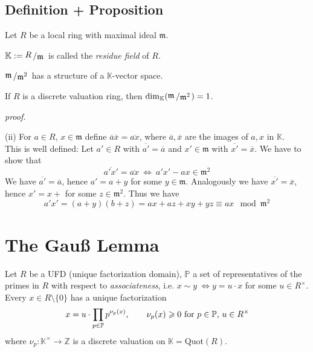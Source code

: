 \documentclass[12pt]{book}
\newcommand{\slant}[2]{{\raisebox{.1em}{$#1$}\left/\raisebox{-.1em}{$#2$}\right.}}
\begin{document}
\begin{spacing}{1.3}
\subsection{Definition + Proposition} %
Let $R$ be a local ring with maximal ideal $\mathfrak{m}$. 
\begin{compactenum}
\item $\mathbb{K}:= \slant{R}{\mathfrak{m}}$ is called the \textit{residue field} of $R$.
\item $\slant{\mathfrak{m}}{\mathfrak{m}^2}$ has a structure of a $\mathbb{K}$-vector space.
\item If $R$ is a discrete valuation ring, then $\dim_{\mathbb{K}}(\slant{\mathfrak{m}}{\mathfrak{m}^2})=1$.
\end{compactenum}
\pagebreak 
\textit{proof.}
\begin{compactenum}
\item[(ii)] For $a \in R$, $x \in \mathfrak{m}$ define $\overline{a} \overline{x}=\overline{ax}$, where $\overline{a}, \overline{x}$ are the images of $a,x$ in $\mathbb{K}$.\\
This is well defined: Let $a' \in R$ with $\overline{a'}=\overline{a}$ and $x'\in \mathfrak{m}$ with $\overline{x'}=\overline{x}$. We have to show that $$\overline{a'x'}=\overline{ax} \ \Longleftrightarrow \ a'x' - ax \in \mathfrak{m}^2$$
We have $\overline{a'}=\overline{a}$, hence $a'=a+y$ for some $y \in \mathfrak{m}$. Analogously we have $\overline{x'}=\overline{x}$, hence $x'=x+$ for some $z \in \mathfrak{m}^2$. Thus we have
$$a'x'=(a+y)(b+z)=ax+az+xy+yz \equiv ax \mod \mathfrak{m}^2$$
\end{compactenum}



\renewcommand*\thesection{§ \arabic{section}\quad}
\section{The Gauß Lemma}
\renewcommand*\thesection{\arabic{section}}

Let $R$ be a UFD (unique factorization domain), $\mathbb{P}$ a set of representatives of the primes in $R$ with respect to \textit{associateness}, i.e. $x \sim y \ \Leftrightarrow y=u\cdot x$ for some $u \in R^{\times}$.\\
Every $x \in R\setminus \{0\}$ has a unique factorization 
$$x=u \cdot \prod_{p \in \mathbb{P}} p^{\nu_p(x)}, \qquad  \nu_p(x) \geqslant 0 \textrm{ for } p \in \mathbb{P} \textrm, \ u \in R^{\times} $$
where $\nu_p: \mathbb{K}^{\times} \longrightarrow \mathbb{Z}$ is a discrete valuation on $\mathbb{K}=\textrm{Quot}(R)$.


\end{spacing}
\end{document}
